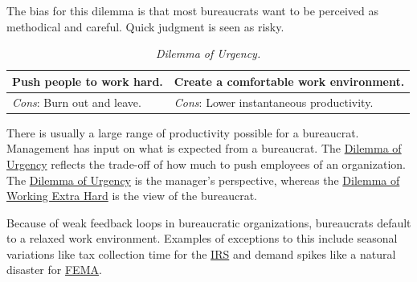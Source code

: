The bias for this dilemma is that most bureaucrats want to be perceived as methodical and careful. Quick judgment is seen as risky. 


\begin{center}
\begin{table}[H] %
\begin{tabular}{ | m{\dilemmatablewidth}| m{\dilemmatablewidth} | } 
  \hline
  \textbf{Push people to work hard.} & 
  \textbf{Create a comfortable work environment.} \\ 
  \hline
  \textit{Cons}: Burn out and leave. & 
  \textit{Cons}: Lower instantaneous productivity. \\  
  \hline
\end{tabular}
\caption{
\textit{Dilemma of Urgency.}
}
\label{table:dilemma-personal-manager-rate-of-work}
\end{table}
\end{center}

There is usually a large range of productivity possible for a bureaucrat. Management has input on what is expected from 
 a bureaucrat. The 
\hyperref[table:dilemma-personal-manager-rate-of-work]{Dilemma of Urgency} reflects the trade-off of how much to push employees of an organization. The \hyperref[table:dilemma-personal-manager-rate-of-work]{Dilemma of Urgency} is the manager's perspective, whereas the
\hyperref[table:dilemma-personal-work-extra-or-work-as-expected]{Dilemma of Working Extra Hard}
is the view of the bureaucrat. 


Because of weak feedback loops in bureaucratic organizations, bureaucrats default to a relaxed work environment. Examples of exceptions to this include seasonal variations like tax collection time for the \href{https://en.wikipedia.org/wiki/Internal_Revenue_Service}{IRS} 
%
%
and demand spikes like a natural disaster for \href{https://en.wikipedia.org/wiki/Federal_Emergency_Management_Agency}{FEMA}. 

